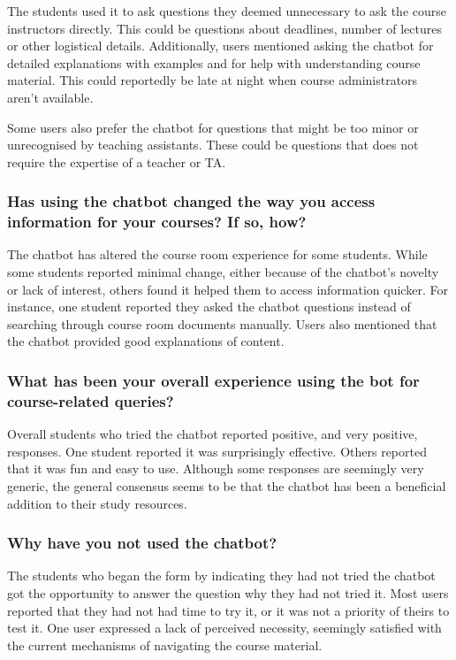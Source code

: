 The students used it to ask questions they deemed unnecessary to ask the course instructors directly. This could be questions about deadlines, number of lectures or other logistical details. Additionally, users mentioned asking the chatbot for detailed explanations with examples and for help with understanding course material. This could reportedly be late at night when course administrators aren’t available.


Some users also prefer the chatbot for questions that might be too minor or unrecognised by teaching assistants. These could be questions that does not require the expertise of a teacher or TA.


\subsubsection{Has using the chatbot changed the way you access information for your courses? If so, how?}


The chatbot has altered the course room experience for some students. While some students reported minimal change, either because of the chatbot's novelty or lack of interest, others found it helped them to access information quicker. For instance, one student reported they asked the chatbot questions instead of searching through course room documents manually. Users also mentioned that the chatbot provided good explanations of content.


\subsubsection{What has been your overall experience using the bot for course-related queries?}


Overall students who tried the chatbot reported positive, and very positive, responses. One student reported it was surprisingly effective. Others reported that it was fun and easy to use. Although some responses are seemingly very generic, the general consensus seems to be that the chatbot has been a beneficial addition to their study resources.


\subsubsection{Why have you not used the chatbot?}


The students who began the form by indicating they had not tried the chatbot got the opportunity to answer the question why they had not tried it. Most users reported that they had not had time to try it, or it was not a priority of theirs to test it. One user expressed a lack of perceived necessity, seemingly satisfied with the current mechanisms of navigating the course material.


